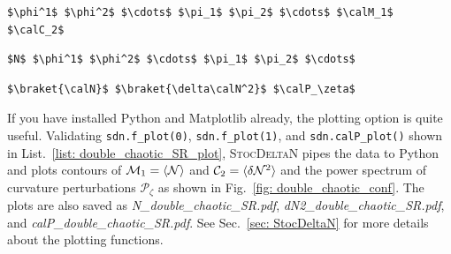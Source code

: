 \documentclass[aps, prd
, preprint
, nofootinbib 
, notitlepage
, superscriptaddress
, longbibliography
]{revtex4-1}
\newcommand{\calC}{\mathcal{C}}
\newcommand{\calM}{\mathcal{M}}
\newcommand{\calN}{\mathcal{N}}
\newcommand{\calP}{\mathcal{P}}
\begin{document}
\vfill

\begin{lstlisting}[numbers = none, mathescape, caption={\textit{Mn\_}$\braket{\text{model name}}$\textit{.dat} : 
contour data of $\calM_n=\braket{\calN^n}$ and $\calC_2=\braket{\delta\calN^2}$}, label = list: Mn_double_chaotic_SR.dat]
$\phi^1$ $\phi^2$ $\cdots$ $\pi_1$ $\pi_2$ $\cdots$ $\calM_1$ $\calC_2$
\end{lstlisting}

\begin{lstlisting}[numbers = none, mathescape, caption={\textit{traj\_}$\braket{\text{model name}}$\textit{.dat} : trajectory data of one sample path}, 
label = list: traj_double_chaotic_SR.dat]
$N$ $\phi^1$ $\phi^2$ $\cdots$ $\pi_1$ $\pi_2$ $\cdots$
\end{lstlisting}

\begin{lstlisting}[numbers = none, mathescape, caption={\textit{calP\_}$\braket{\text{model name}}$\textit{.dat} : data related to curvature perturbation}, 
label = list: calP_double_chaotic_SR.dat]
$\braket{\calN}$ $\braket{\delta\calN^2}$ $\calP_\zeta$
\end{lstlisting}

If you have installed Python and Matplotlib already, the plotting option is quite useful.
Validating \texttt{sdn.f\_plot(0)}, \texttt{sdn.f\_plot(1)}, and \texttt{sdn.calP\_plot()} shown in List.~\ref{list: double_chaotic_SR_plot},
\textsc{StocDeltaN} pipes the data to Python and plots contours of $\calM_1=\braket{\calN}$ and $\calC_2=\braket{\delta\calN^2}$ 
and the power spectrum of curvature perturbations $\calP_\zeta$ as shown in
Fig.~\ref{fig: double_chaotic_conf}. The plots are also saved as \textit{N\_double\_chaotic\_SR.pdf}, \textit{dN2\_double\_chaotic\_SR.pdf}, and
\textit{calP\_double\_chaotic\_SR.pdf}.
See Sec.~\ref{sec: StocDeltaN} for more details about the plotting functions.
\end{document}
